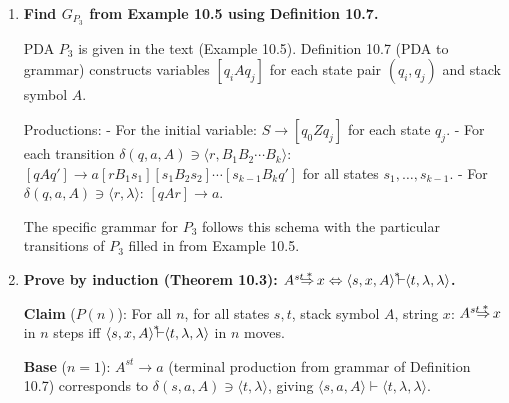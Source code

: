 \begin{enumerate}[{10.}1. ]
\begin{enumerate}
\item \textbf{PDA via empty stack}: Pop $Z$ as well; add $\delta(\cdot,\lambda,Z)=\langle q_f,\lambda\rangle$ with appropriate state.

\item \textbf{DPDA}: Yes. The language has a fixed block structure: $\pmb{a}^i,\pmb{b}^j,\pmb{c}^j,\pmb{d}^i$, so the DPDA deterministically processes each block. The stack remembers $i$ (via $A$s) and $j$ (via $B$s overlaid on top). This is deterministic.

\item \textbf{Counting automaton}: No; both $i$ and $j$ are unbounded.

\item \textbf{Grammar from PDA} (Definition 10.7): Apply the construction to the PDA in part (b). Variables $\langle q_i, X, q_j\rangle$ with appropriate productions derived from the transitions.
\end{enumerate}

\item \textbf{Find $G_{P_3}$ from Example 10.5 using Definition 10.7.}

PDA $P_3$ is given in the text (Example 10.5). Definition 10.7 (PDA to grammar) constructs variables $[q_i A q_j]$ for each state pair $(q_i,q_j)$ and stack symbol $A$.

Productions:
- For the initial variable: $S \to [q_0 Z q_j]$ for each state $q_j$.
- For each transition $\delta(q,a,A) \ni \langle r, B_1 B_2\cdots B_k\rangle$:
  $[q A q'] \to a [r B_1 s_1][s_1 B_2 s_2]\cdots[s_{k-1} B_k q']$ for all states $s_1,\ldots,s_{k-1}$.
- For $\delta(q,a,A) \ni \langle r,\lambda\rangle$: $[q A r] \to a$.

The specific grammar for $P_3$ follows this schema with the particular transitions of $P_3$ filled in from Example 10.5.

\item \textbf{Prove by induction (Theorem 10.3): $A^{st}\DRightarrow x \Leftrightarrow \langle s,x,A\rangle\Dvdash\langle t,\lambda,\lambda\rangle$.}

\textbf{Claim} ($P(n)$): For all $n$, for all states $s,t$, stack symbol $A$, string $x$: $A^{st}\DRightarrow x$ in $n$ steps iff $\langle s,x,A\rangle\Dvdash\langle t,\lambda,\lambda\rangle$ in $n$ moves.

\textbf{Base} ($n=1$): $A^{st} \to a$ (terminal production from grammar of Definition 10.7) corresponds to $\delta(s,a,A) \ni \langle t,\lambda\rangle$, giving $\langle s,a,A\rangle\vdash\langle t,\lambda,\lambda\rangle$. \checkmark


\end{enumerate}
